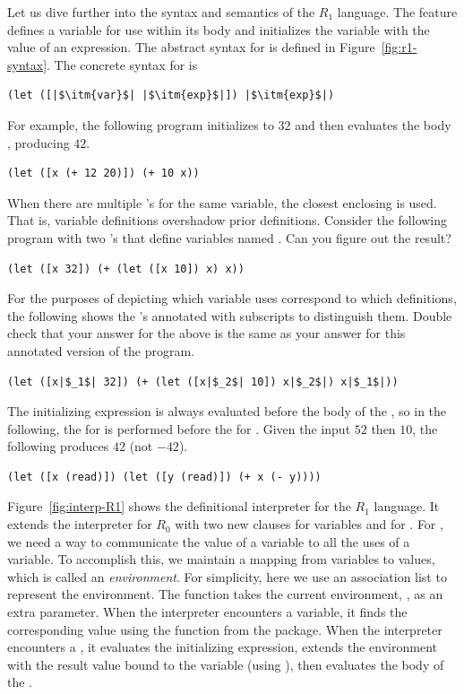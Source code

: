 \documentclass[11pt]{book}
\begin{document}
Let us dive further into the syntax and semantics of the $R_1$
language.  The  feature defines a variable for use within its
body and initializes the variable with the value of an expression.
The abstract syntax for  is defined in Figure~\ref{fig:r1-syntax}.
The concrete syntax for  is
\begin{lstlisting}
(let ([|$\itm{var}$| |$\itm{exp}$|]) |$\itm{exp}$|)
\end{lstlisting}
For example, the following program initializes  to $32$ and then
evaluates the body , producing $42$.
\begin{lstlisting}
(let ([x (+ 12 20)]) (+ 10 x))
\end{lstlisting}
When there are multiple 's for the same variable, the closest
enclosing  is used. That is, variable definitions overshadow
prior definitions. Consider the following program with two 's
that define variables named . Can you figure out the result?
\begin{lstlisting}
(let ([x 32]) (+ (let ([x 10]) x) x))
\end{lstlisting}
For the purposes of depicting which variable uses correspond to which
definitions, the following shows the 's annotated with
subscripts to distinguish them. Double check that your answer for the
above is the same as your answer for this annotated version of the
program.
\begin{lstlisting}
(let ([x|$_1$| 32]) (+ (let ([x|$_2$| 10]) x|$_2$|) x|$_1$|))
\end{lstlisting}
The initializing expression is always evaluated before the body of the
, so in the following, the  for  is
performed before the  for . Given the input
$52$ then $10$, the following produces $42$ (not $-42$).
\begin{lstlisting}
(let ([x (read)]) (let ([y (read)]) (+ x (- y))))
\end{lstlisting}

Figure~\ref{fig:interp-R1} shows the definitional interpreter for the
$R_1$ language. It extends the interpreter for $R_0$ with two new
 clauses for variables and for .  For ,
we need a way to communicate the value of a variable to all the uses
of a variable. To accomplish this, we maintain a mapping from
variables to values, which is called an \emph{environment}. For
simplicity, here we use an association list to represent the
environment. The  function takes the current
environment, , as an extra parameter.  When the interpreter
encounters a variable, it finds the corresponding value using the
 function from the  package.  When
the interpreter encounters a , it evaluates the initializing
expression, extends the environment with the result value bound to the
variable (using ), then evaluates the body of the
.
\end{document}
